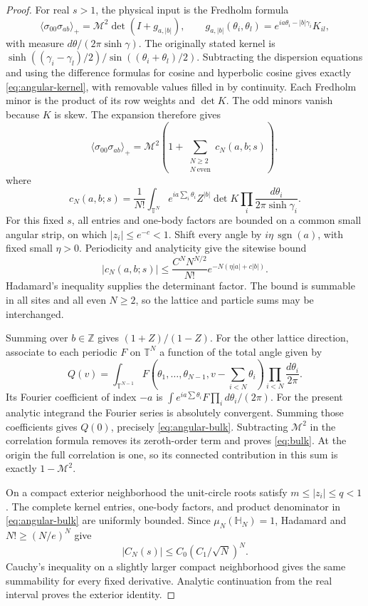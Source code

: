 \documentclass[11pt]{article}
\numberwithin{equation}{section}
\theoremstyle{remark}\newtheorem{remark}[theorem]{Remark}
\newcommand{\Mtwo}{\mathcal M^2}
\begin{document}
\begin{proof}
For real $s>1$, the physical input is the Fredholm formula
\[
 \langle\sigma_{00}\sigma_{ab}\rangle_+
       =\Mtwo\det(I+g_{a,|b|}),\qquad
 g_{a,|b|}(\theta_i,\theta_l)
       =e^{ia\theta_i-|b|\gamma_i}K_{il},
\]
with measure $d\theta/(2\pi\sinh\gamma)$.
The originally stated kernel is
$\sinh((\gamma_i-\gamma_l)/2)/\sin((\theta_i+\theta_l)/2)$.
Subtracting the dispersion equations and using the difference
formulas for cosine and hyperbolic cosine gives exactly
\eqref{eq:angular-kernel}, with removable values filled in by
continuity. Each Fredholm minor is the product of its row weights
and $\det K$. The odd minors vanish because $K$ is skew.
The expansion therefore gives
\[
 \langle\sigma_{00}\sigma_{ab}\rangle_+
   =\Mtwo\left(1+\sum_{\substack{N\ge2\\N\ \mathrm{even}}}
                         c_N(a,b;s)\right),
\]
where
\[
 c_N(a,b;s)=\frac1{N!}\int_{\mathbb T^N}
       e^{ia\sum_i\theta_i}Z^{|b|}\det K
                    \prod_i\frac{d\theta_i}{2\pi\sinh\gamma_i}.
\]
For this fixed $s$, all entries and one-body factors are bounded on
a common small angular strip, on which $|z_i|\le e^{-c}<1$.
Shift every angle by $i\eta\,\operatorname{sgn}(a)$, with fixed
small $\eta>0$. Periodicity and analyticity give the sitewise bound
\[
 |c_N(a,b;s)|\le\frac{C^N N^{N/2}}{N!}
                    e^{-N(\eta|a|+c|b|)}.
\]
Hadamard's inequality supplies the determinant factor. The bound is
summable in all sites and all even $N\ge2$, so the lattice and
particle sums may be interchanged.

Summing over $b\in\mathbb Z$ gives $(1+Z)/(1-Z)$. For the other
lattice direction, associate to each periodic $F$ on $\mathbb T^N$
a function of the total angle given by
\[
 Q(v)=\int_{\mathbb T^{N-1}}
 F(\theta_1,\ldots,\theta_{N-1},v-\textstyle\sum_{i<N}\theta_i)
                 \prod_{i<N}\frac{d\theta_i}{2\pi}.
\]
Its Fourier coefficient of index $-a$ is
$\int e^{ia\sum\theta_i}F\prod_i d\theta_i/(2\pi)$.
For the present analytic integrand the Fourier series is absolutely
convergent. Summing those coefficients gives $Q(0)$, precisely
\eqref{eq:angular-bulk}. Subtracting $\Mtwo$ in the correlation
formula removes its zeroth-order term and proves \eqref{eq:bulk}.
At the origin the full correlation is one, so its connected
contribution in this sum is exactly $1-\Mtwo$.

On a compact exterior neighborhood the unit-circle roots satisfy
$m\le|z_i|\le q<1$. The complete kernel entries, one-body factors,
and product denominator in \eqref{eq:angular-bulk} are uniformly
bounded. Since $\mu_N(\mathbb H_N)=1$, Hadamard and
$N!\ge(N/e)^N$ give
\[
 |C_N(s)|\le C_0(C_1/\sqrt N)^N.
\]
Cauchy's inequality on a slightly larger compact neighborhood gives
the same summability for every fixed derivative. Analytic continuation
from the real interval proves the exterior identity.
\end{proof}
\end{document}
